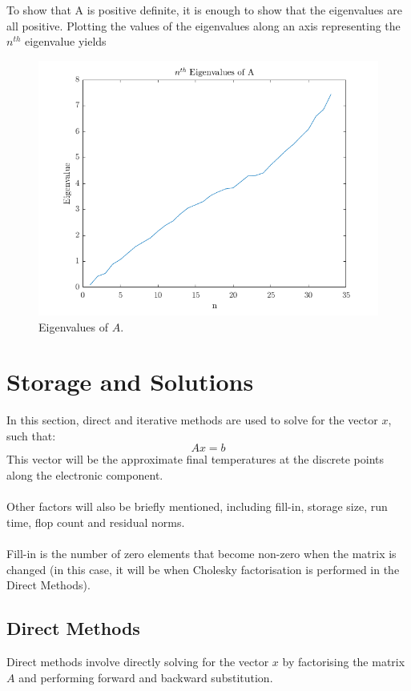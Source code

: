 \documentclass[12pt,a4paper]{article}
\begin{document}
\\\\To show that A is positive definite, it is enough to show that the eigenvalues are all positive. Plotting the values of the eigenvalues along an axis representing the $n^{th}$ eigenvalue yields\begin{figure}[H]
	\includegraphics[width=\linewidth]{images/eigenvaluePlot.png}
	\caption{Eigenvalues of $A$.}
	\label{fig:eigenvalues}
\end{figure}

\section{Storage and Solutions}
In this section, direct and iterative methods are used to solve for the vector $x$, such that:
\[Ax=b\]
This vector will be the approximate final temperatures at the discrete points along the electronic component. \\\\Other factors will also be briefly mentioned, including fill-in, storage size, run time, flop count and residual norms.\\\\Fill-in is the number of zero elements that become non-zero when the matrix is changed (in this case, it will be when Cholesky factorisation is performed in the Direct Methods).
\subsection{Direct Methods}
Direct methods involve directly solving for the vector $x$ by factorising the matrix $A$ and performing forward and backward substitution.
\end{document}

